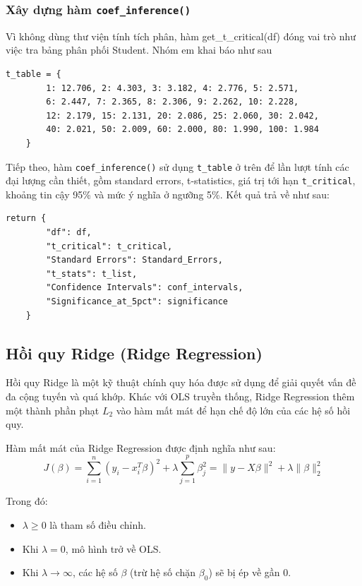 \subsubsection{Xây dựng hàm \texttt{coef\_inference()}}
Vì không dùng thư viện tính tích phân, hàm get\_t\_critical(df) đóng vai trò như việc tra bảng phân phối Student. Nhóm em khai báo như sau
\begin{lstlisting}[style = python]
t_table = {
        1: 12.706, 2: 4.303, 3: 3.182, 4: 2.776, 5: 2.571,
        6: 2.447, 7: 2.365, 8: 2.306, 9: 2.262, 10: 2.228,
        12: 2.179, 15: 2.131, 20: 2.086, 25: 2.060, 30: 2.042,
        40: 2.021, 50: 2.009, 60: 2.000, 80: 1.990, 100: 1.984
    }
\end{lstlisting}

Tiếp theo, hàm \texttt{coef\_inference()} sử dụng \texttt{t\_table} ở trên để lần lượt tính các đại lượng cần thiết, gồm standard errors, t-statistics, giá trị tới hạn \texttt{t\_critical}, khoảng tin cậy 95\% và mức ý nghĩa ở ngưỡng 5\%. Kết quả trả về như sau:

\begin{lstlisting}[style = python]
return {
        "df": df,
        "t_critical": t_critical,
        "Standard Errors": Standard_Errors,
        "t_stats": t_list,
        "Confidence Intervals": conf_intervals,
        "Significance_at_5pct": significance
    }
\end{lstlisting}
\subsection{Hồi quy Ridge (Ridge Regression)}

Hồi quy Ridge là một kỹ thuật chính quy hóa được sử dụng để giải quyết vấn đề đa cộng tuyến và quá khớp. Khác với OLS truyền thống, Ridge Regression thêm một thành phần phạt $L_2$ vào hàm mất mát để hạn chế độ lớn của các hệ số hồi quy.

Hàm mất mát của Ridge Regression được định nghĩa như sau:
\begin{equation}
    J(\beta) = \sum_{i=1}^{n} (y_i - x_i^T \beta)^2 + \lambda \sum_{j=1}^{p} \beta_j^2 = \|y - X\beta\|^2 + \lambda \|\beta\|_2^2
\end{equation}

Trong đó:
\begin{itemize}
    \item $\lambda \ge 0$ là tham số điều chỉnh.
    \item Khi $\lambda = 0$, mô hình trở về OLS.
    \item Khi $\lambda \to \infty$, các hệ số $\beta$ (trừ hệ số chặn $\beta_0$) sẽ bị ép về gần 0.
\end{itemize}

